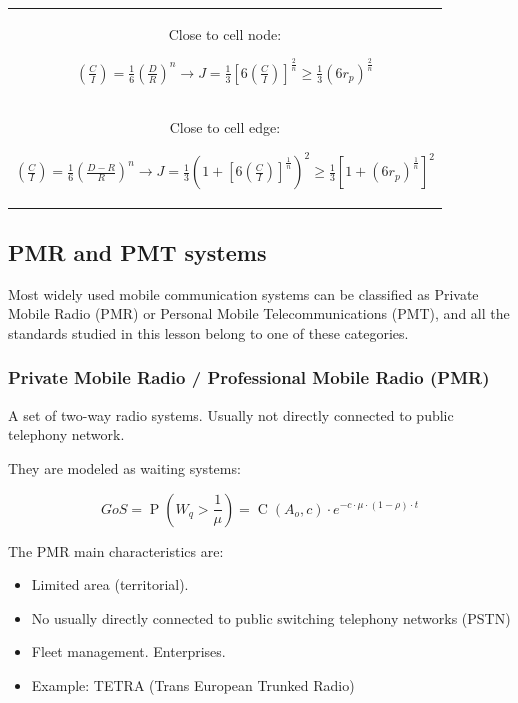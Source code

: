 \documentclass[../main.tex]{subfiles}
\begin{document}
\begin{tabular}{|c|}
	Close to cell node:

	$
		\left( \frac{C}{I} \right) = \frac {1} {6} \left( \frac {D} {R} \right)^n \rightarrow
		J = \frac {1} {3} \left[ 6 \left( \frac{C}{I} \right) \right]^{\frac {2} {n}} \geq \frac {1} {3} \left( 6 r_p \right)^{\frac{2}{n}}
	$\\

	Close to cell edge:

	$
		\left( \frac{C}{I} \right) = \frac {1} {6} \left( \frac {D - R} {R} \right)^n \rightarrow
		J = \frac {1} {3} \left( 1 + \left[ 6 \left( \frac{C}{I} \right) \right]^{\frac {1} {n}} \right)^2 \geq \frac {1} {3} \left[ 1 + \left( 6 r_p \right)^{\frac{1}{n}} \right]^2
	$\\	

	\hline
\end{tabular}

\subsection{PMR and PMT systems}

Most widely used mobile communication systems can be classified as Private Mobile Radio (PMR) or Personal Mobile Telecommunications (PMT), and all the standards studied in this lesson belong to one of these categories.

\subsubsection{Private Mobile Radio / Professional Mobile Radio (PMR)}

A set of two-way radio systems. Usually not directly connected to public telephony network.

They are modeled as waiting systems:

$$
	GoS = \operatorname{P} \left( W_q > \frac{1}{\mu} \right) = \operatorname{C}(A_o, c) \cdot e^{- c \cdot \mu \cdot (1-\rho) \cdot t}
$$

The PMR main characteristics are:

\begin{itemize}
	\item Limited area (territorial).
	\item No usually directly connected to public switching telephony networks (PSTN)
	\item Fleet management. Enterprises.
	\item Example: TETRA (Trans European Trunked Radio)
\end{itemize}
\end{document}
